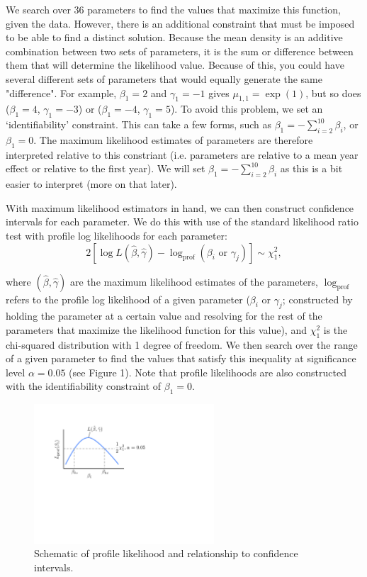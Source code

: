 \documentclass[11pt]{article}
\begin{document}
We search over 36 parameters to find the values that maximize this function, given the data. However, there is an additional constraint that must be imposed to be able to find a distinct solution. Because the mean density is an additive combination between two sets of parameters, it is the sum or difference between them that will determine the likelihood value. Because of this, you could have several different sets of parameters that would equally generate the same "difference". For example, $\beta_1 = 2$ and $\gamma_1= -1$ gives $\mu_{1,1} = \exp(1)$, but so does ($\beta_1 = 4$, $\gamma_1= -3$) or ($\beta_1 = -4$, $\gamma_1= 5$). To avoid this problem, we set an `identifiability' constraint. This can take a few forms, such as $\beta_1 = - \sum_{i=2}^{10}\beta_i$, or $\beta_1 =0$. The maximum likelihood estimates of parameters are therefore interpreted relative to this constriant (i.e. parameters are relative to a mean year effect or relative to the first year). We will set $\beta_1 = - \sum_{i=2}^{10}\beta_i$ as this is a bit easier to interpret (more on that later).

With maximum likelihood estimators in hand, we can then construct confidence intervals for each parameter. We do this with use of the standard likelihood ratio test with profile log likelihoods for each parameter:
\[
2\left[ \log L(\hat{\beta},\hat{\gamma}) - \log_{\text{prof}}(\beta_i \text{ or } \gamma_j) \right] \sim \chi^2_1,
\]

\noindent where $(\hat{\beta},\hat{\gamma})$ are the maximum likelihood estimates of the parameters, $\log_{\text{prof}}$ refers to the profile log likelihood of a given parameter ($\beta_i \text{ or } \gamma_j$; constructed by holding the parameter at a certain value and resolving for the rest of the parameters that maximize the likelihood function for this value), and $\chi^2_1$ is the chi-squared distribution with 1 degree of freedom. We then search over the range of a given parameter to find the values that satisfy this inequality at significance level $\alpha=0.05$ (see Figure 1). Note that profile likelihoods are also constructed with the identifiability constraint of $\beta_1 =0$.

\begin{figure}[h]
\centering
\includegraphics[width=0.6\textwidth]{logL_figure.pdf}
\caption{Schematic of profile likelihood and relationship to confidence intervals.}
\end{figure}
\end{document}
